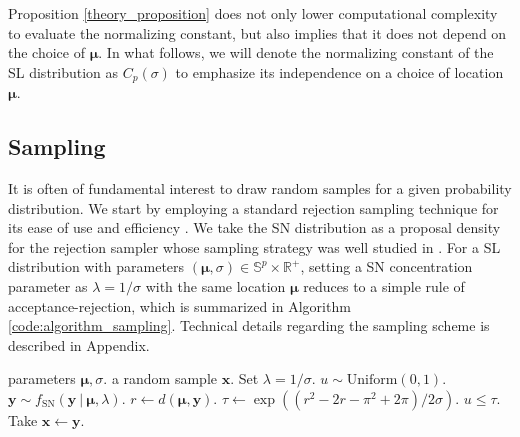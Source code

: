 \documentclass[10pt]{article}
\newcommand{\bfx}{\mathbf{x}}
\newcommand{\bfy}{\mathbf{y}}
\newcommand{\bfmu}{\boldsymbol{\mu}}
\newcommand{\bbS}{\mathbb{S}}
\newcommand{\bbRpos}{\mathbb{R}^+}
\newcommand{\fSN}{f_{\textrm{SN}}}
\begin{document}
Proposition \ref{theory_proposition} does not only lower computational complexity to evaluate the normalizing constant, but also implies that it does not depend on the choice of $\bfmu$. In what follows, we will denote the normalizing constant of the SL distribution as $C_p (\sigma)$ to emphasize its independence on a choice of location $\bfmu$. 


\subsection{Sampling}

It is often of fundamental interest to draw random samples for a given probability distribution. We start by employing a standard rejection sampling technique for its ease of use and efficiency \cite{bishop_2006_PatternRecognitionMachine}. We take the SN distribution as a  proposal density for the rejection sampler whose sampling strategy was well studied in \cite{hauberg_2018_DirectionalStatisticsSpherical}. For a SL distribution with parameters $(\bfmu, \sigma) \in \bbS^p \times \bbRpos$, setting a SN concentration parameter as $\lambda = 1/\sigma$ with the same location $\bfmu$ reduces to a simple rule of acceptance-rejection, which is summarized in Algorithm \ref{code:algorithm_sampling}. Technical details regarding the sampling scheme is described in Appendix.


\begin{algorithm}[t]
	\caption{Rejection Sampling from the SL distribution}
	\label{code:algorithm_sampling}
	\begin{algorithmic}
		\REQUIRE parameters $\bfmu, \sigma$.
		\ENSURE a random sample $\bfx$.
		\STATE Set $\lambda = 1/\sigma$.
		\REPEAT 
		\STATE $u \sim \text{Uniform}(0,1)$.
		\STATE $\bfy \sim \fSN(\bfy~|~\bfmu, \lambda)$.
		\STATE $r \leftarrow d(\bfmu, \bfy)$.
		\STATE $\tau \leftarrow \exp( (r^2-2r-\pi^2+2\pi)  / 2\sigma)$.
		\UNTIL $u \leq \tau$.
		\STATE  Take $\bfx \leftarrow \bfy$.
	\end{algorithmic}
\end{algorithm}
\end{document}
